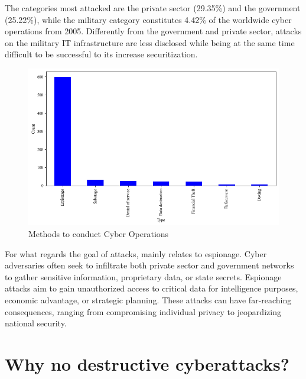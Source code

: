The categories most attacked are the private sector (29.35\%) and the government (25.22\%), while the military category constitutes 4.42\% of the worldwide cyber operations from 2005. Differently from the government and private sector, attacks on the military IT infrastructure are less disclosed while being at the same time difficult to be successful to its increase securitization. 

\begin{figure}[H]
    \centering
    \includegraphics[width=\textwidth]{Images/top10type.png}
    \caption{Methods to conduct Cyber Operations}
    \label{fig:top10type}
\end{figure}

For what regards the goal of attacks, mainly relates to espionage. Cyber adversaries often seek to infiltrate both private sector and government networks to gather sensitive information, proprietary data, or state secrets. Espionage attacks aim to gain unauthorized access to critical data for intelligence purposes, economic advantage, or strategic planning. These attacks can have far-reaching consequences, ranging from compromising individual privacy to jeopardizing national security. 

\section{Why no destructive cyberattacks? }

